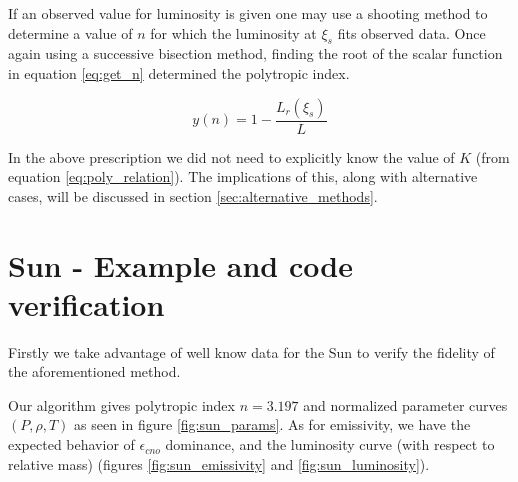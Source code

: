 \documentclass{aa}
\begin{document}
If an observed value for luminosity is given one may use a shooting method to
determine a value of $n$ for which the luminosity at $\xi_s$ fits observed data.
Once again using a successive bisection method, finding the root of the scalar
function in equation \ref{eq:get_n} determined the polytropic index.

\begin{equation}
  \label{eq:get_n}
  y(n) = 1 - \frac{L_r(\xi_s)}{L}
\end{equation}

In the above prescription we did not need to explicitly know the value of $K$
(from equation \ref{eq:poly_relation}). The implications of this, along with
alternative cases, will be discussed in section \ref{sec:alternative_methods}.

\section{Sun - Example and code verification}
\label{sec:code_verification}

Firstly we take advantage of well know data for the Sun to verify the fidelity of the aforementioned method.

Our algorithm gives polytropic index $n = 3.197$ and normalized parameter
curves $(P, \rho, T)$ as seen in figure \ref{fig:sun_params}. As for emissivity,
we have the expected behavior of $\epsilon_{cno}$ dominance, and the
luminosity curve (with respect to relative mass) (figures
\ref{fig:sun_emissivity} and \ref{fig:sun_luminosity}).
\end{document}

